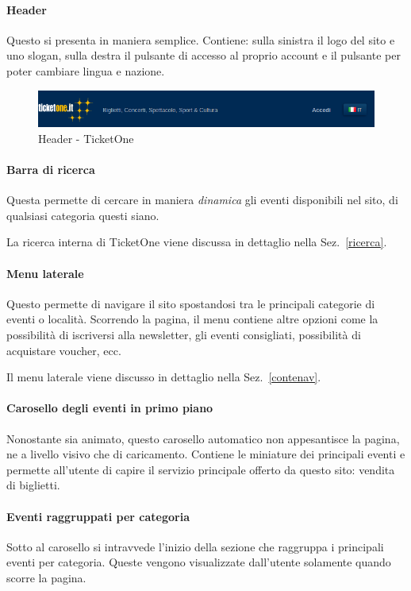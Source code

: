 	\paragraph{Header} Questo si presenta in maniera semplice. 
	Contiene: sulla sinistra il logo del sito e uno slogan, sulla destra il pulsante di accesso al proprio account e il pulsante per poter cambiare lingua e nazione.
	\begin{figure}
		\centering
		\includegraphics[width=\textwidth]{img/header.png}
		\caption{Header - TicketOne}
		\label{header}
	\end{figure}

	\paragraph{Barra di ricerca} Questa permette di cercare in maniera \textit{dinamica} gli eventi disponibili nel sito, di qualsiasi categoria questi siano.
	\par La ricerca interna di TicketOne viene discussa in dettaglio nella Sez.~\ref{ricerca}.
		
	\paragraph{Menu laterale} Questo permette di navigare il sito spostandosi tra le principali categorie di eventi o località.
	Scorrendo la pagina, il menu contiene altre opzioni come la possibilità di iscriversi alla newsletter, gli eventi consigliati, possibilità di acquistare voucher, ecc.
	\par Il menu laterale viene discusso in dettaglio nella Sez.~\ref{contenav}.
	
	\paragraph{Carosello degli eventi in primo piano} Nonostante sia animato, questo carosello automatico non appesantisce la pagina, ne a livello visivo che di caricamento.
	Contiene le miniature dei principali eventi e permette all'utente di capire il servizio principale offerto da questo sito: vendita di biglietti.
	
	\paragraph{Eventi raggruppati per categoria} Sotto al carosello si intravvede l'inizio della sezione che raggruppa i principali eventi per categoria.
	Queste vengono visualizzate dall'utente solamente quando scorre la pagina.

